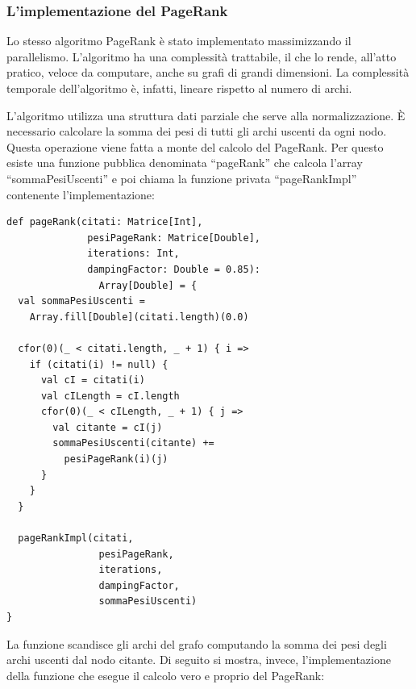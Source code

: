 \documentclass[a4paper, 12pt]{article}
\begin{document}
\subsubsection{L'implementazione del PageRank}
Lo stesso algoritmo PageRank è stato implementato massimizzando il parallelismo. L'algoritmo ha una complessità trattabile, il che lo rende, all'atto pratico, veloce da computare, anche su grafi di grandi dimensioni. La complessità temporale dell'algoritmo è, infatti, lineare rispetto al numero di archi.
\par
L'algoritmo utilizza una struttura dati parziale che serve alla normalizzazione. \`E necessario calcolare la somma dei pesi di tutti gli archi uscenti da ogni nodo. Questa operazione viene fatta a monte del calcolo del PageRank. Per questo esiste una funzione pubblica denominata ``pageRank'' che calcola l'array ``sommaPesiUscenti'' e poi chiama la funzione privata ``pageRankImpl'' contenente l'implementazione:
\begin{lstlisting}[keepspaces=true]
def pageRank(citati: Matrice[Int],
              pesiPageRank: Matrice[Double],
              iterations: Int,
              dampingFactor: Double = 0.85):
                Array[Double] = {
  val sommaPesiUscenti =
    Array.fill[Double](citati.length)(0.0)

  cfor(0)(_ < citati.length, _ + 1) { i =>
    if (citati(i) != null) {
      val cI = citati(i)
      val cILength = cI.length
      cfor(0)(_ < cILength, _ + 1) { j =>
        val citante = cI(j)
        sommaPesiUscenti(citante) +=
          pesiPageRank(i)(j)
      }
    }
  }

  pageRankImpl(citati,
                pesiPageRank,
                iterations,
                dampingFactor,
                sommaPesiUscenti)
}
\end{lstlisting}
La funzione scandisce gli archi del grafo computando la somma dei pesi degli archi uscenti dal nodo citante.
Di seguito si mostra, invece, l'implementazione della funzione che esegue il calcolo vero e proprio del PageRank:
\end{document}
